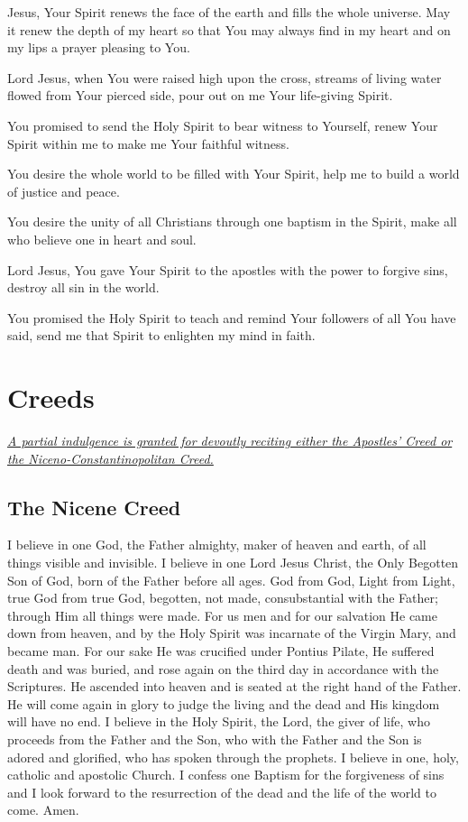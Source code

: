 \documentclass[12pt]{article}
\newcommand{\prayersection}[1]{\section{#1}}
\newcommand{\prayertitle}[1]{\subsection{#1}}
\newcommand{\indulgencedprayertitle}[1]{\prayertitle{#1 \protect\kreuz}}
\newcommand{\note}[1]{{\small{\textsl{#1}}}\newline}
\newcommand{\linkednote}[2]{\hyperlink{#1}{\note{#2}}}
\begin{document}
Jesus, Your Spirit renews the face of the earth and fills the whole universe.
May it renew the depth of my heart so that You may always find in my heart and on my lips a prayer pleasing to You.

Lord Jesus, when You were raised high upon the cross, streams of living water flowed from Your pierced side, pour out on me Your life-giving Spirit.

You promised to send the Holy Spirit to bear witness to Yourself, renew Your Spirit within me to make me Your faithful witness.

You desire the whole world to be filled with Your Spirit, help me to build a world of justice and peace.

You desire the unity of all Christians through one baptism in the Spirit, make all who believe one in heart and soul.

Lord Jesus, You gave Your Spirit to the apostles with the power to forgive sins, destroy all sin in the world.

You promised the Holy Spirit to teach and remind Your followers of all You have said, send me that Spirit to enlighten my mind in faith.

\newpage

\prayersection{Creeds}
\linkednote{grant28}{A partial indulgence is granted for devoutly reciting either the Apostles' Creed or the Niceno-Constantinopolitan Creed.}
\indulgencedprayertitle{The Nicene Creed}
I believe in one God, the Father almighty, maker of heaven and earth, of all things visible and invisible.
I believe in one Lord Jesus Christ, the Only Begotten Son of God, born of the Father before all ages.
God from God, Light from Light, true God from true God, begotten, not made, consubstantial with the Father;
through Him all things were made.
For us men and for our salvation He came down from heaven, and by the Holy Spirit was incarnate of the Virgin Mary, and became man.
For our sake He was crucified under Pontius Pilate, He suffered death and was buried, and rose again on the third day in accordance with the Scriptures.
He ascended into heaven and is seated at the right hand of the Father.
He will come again in glory to judge the living and the dead and His kingdom will have no end.
I believe in the Holy Spirit, the Lord, the giver of life, who proceeds from the Father and the Son, who with the Father and the Son is adored and glorified, who has spoken through the prophets.
I believe in one, holy, catholic and apostolic Church.
I confess one Baptism for the forgiveness of sins and I look forward to the resurrection of the dead and the life of the world to come.
Amen.
\end{document}
